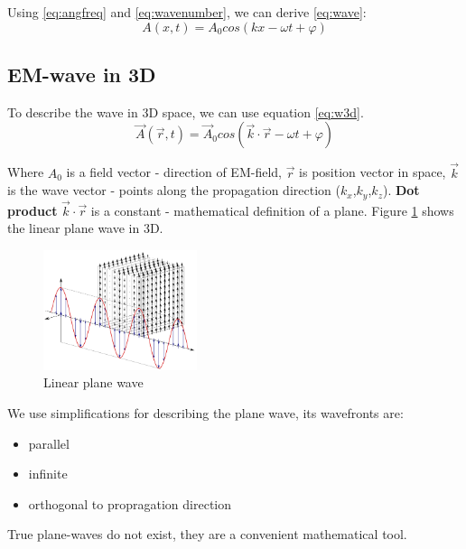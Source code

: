 Using \ref{eq:angfreq} and \ref{eq:wavenumber}, we can derive \ref{eq:wave}:
\begin{equation}
    A(x,t) = A_0 cos(kx - \omega t + \varphi)
    \label{eq:wave}
\end{equation}

\subsection{EM-wave in 3D}
To describe the wave in 3D space, we can use equation \ref{eq:w3d}.
\begin{equation}
    \vec{A}(\vec{r},t) = \vec{A}_0 cos(\vec{k} \cdot \vec{r} - \omega t + \varphi)
    \label{eq:w3d}
\end{equation}

Where $A_0$ is a field vector - direction of EM-field, $\vec{r}$ is position vector in space, 
$\vec{k}$ is the wave vector - points along the propagation direction ($k_x$,$k_y$,$k_z$).
\textbf{Dot product} $\vec{k} \cdot \vec{r}$ is a constant - mathematical definition of a plane.
Figure \ref{fig:linplw} shows the linear plane wave in 3D.

\begin{figure}[h!]
    \centering
    \includegraphics[width=0.4\textwidth]{slike/linplanewave.png}
    \caption{Linear plane wave}
    \label{fig:linplw}
\end{figure}

We use simplifications for describing the plane wave, its wavefronts are:
\begin{itemize}
    \item  parallel
    \item  infinite
    \item  orthogonal to propragation direction
\end{itemize}
True plane-waves do not exist, they are a convenient mathematical tool.



